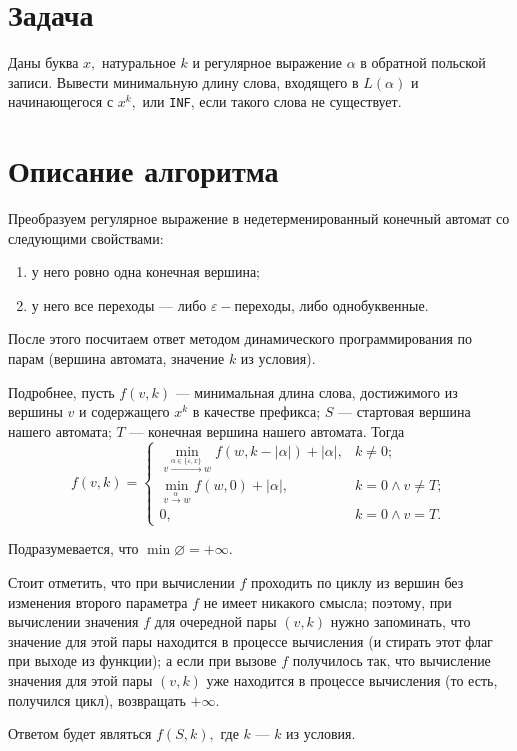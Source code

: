 \documentclass[a4paper,12pt]{article}
\begin{document}
\section*{Задача}

Даны буква $x,$ натуральное $k$ и регулярное выражение $\alpha$ в обратной польской записи.
Вывести минимальную длину слова, входящего в $L(\alpha)$ и начинающегося с $x^k,$ или \texttt{INF},
если такого слова не существует.

\section*{Описание алгоритма}

Преобразуем регулярное выражение в недетерменированный конечный автомат со следующими свойствами:
\begin{enumerate}
    \item у него ровно одна конечная вершина;

    \item у него все переходы --- либо $\varepsilon-$переходы, либо однобуквенные.
\end{enumerate}

После этого посчитаем ответ методом динамического программирования по парам (вершина автомата, значение $k$ из
условия).

Подробнее, пусть $f(v,k)$ --- минимальная длина слова, достижимого из вершины $v$ и содержащего $x^k$ в качестве
префикса; $S$ --- стартовая вершина нашего автомата; $T$ --- конечная вершина нашего автомата.
Тогда
$$
f(v,k)=
\begin{cases}
 \min\limits_{v \xrightarrow{\alpha \in \{\varepsilon, x\}} w} f(w, k - |\alpha|) + |\alpha|, & k \ne 0; \\
 \min\limits_{v \xrightarrow{\alpha} w} f(w, 0) + |\alpha|,                                   & k = 0 \land v \ne T; \\
 0,                                                                                           & k = 0 \land v = T.
\end{cases}
$$

Подразумевается, что $\min \varnothing = +\infty.$

Стоит отметить, что при вычислении $f$ проходить по циклу из вершин без изменения второго параметра $f$ не имеет
никакого смысла; поэтому, при вычислении значения $f$ для очередной пары $(v,k)$ нужно запоминать,
что значение для этой пары находится в процессе вычисления (и стирать этот флаг при выходе из функции);
а если при вызове $f$ получилось так, что вычисление значения для этой пары $(v,k)$ уже находится в процессе вычисления
(то есть, получился цикл), возвращать $+\infty.$

Ответом будет являться $f(S,k),$ где $k$ --- $k$ из условия.
\end{document}
